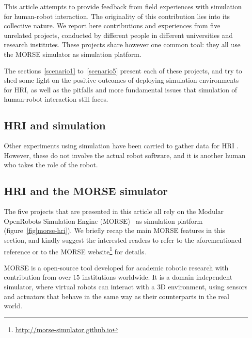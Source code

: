 \documentclass[conference]{IEEEtran}
\begin{document}

This article attempts to provide feedback from field experiences with simulation
for human-robot interaction. The originality of this contribution lies into its
collective nature. We report here contributions and experiences from five
unrelated projects, conducted by different people in different universities and
research institutes. These projects share however one common tool: they all use
the MORSE simulator as simulation platform.

The sections~\ref{scenario1} to~\ref{scenario5} present each of these projects,
and try to shed some light on the positive outcomes of deploying simulation
environments for HRI, as well as the pitfalls and more fundamental issues that
simulation of human-robot interaction still faces.

\subsection*{HRI and simulation}


Other experiments using simulation have been carried to gather data for HRI
\cite{Chernova2011}. However, these do not involve the actual robot software,
and it is another human who takes the role of the robot.

\subsection*{HRI and the MORSE simulator}

The five projects that are presented in this article all rely on the Modular
OpenRobots Simulation Engine (MORSE)~\cite{Echeverria2011, morse_simpar_2012} as
simulation platform (figure~\ref{fig|morse-hri}). We briefly recap the main
MORSE features in this section, and kindly suggest the interested readers to
refer to the aforementioned reference or to the MORSE
website\footnote{\url{http://morse-simulator.github.io}} for details.

MORSE is a open-source tool developed for academic robotic research with
contribution from over 15 institutions worldwide. It is a domain independent
simulator, where virtual robots can interact with a 3D environment, using
sensors and actuators that behave in the same way as their counterparts in the
real world.
\end{document}
